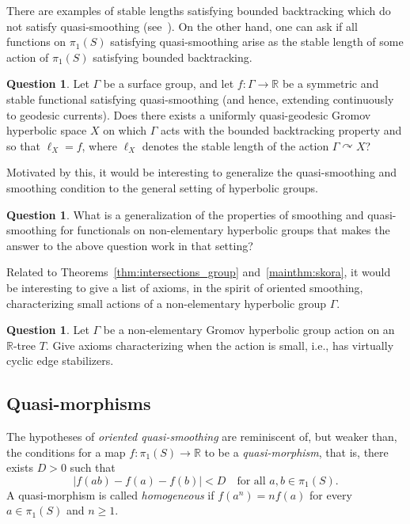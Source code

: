 \documentclass[11pt]{amsart}
\def\acts{\curvearrowright}
\numberwithin{equation}{section}
\numberwithin{figure}{section}
\theoremstyle{definition}
\newtheorem{question}[theorem]{Question}
\theoremstyle{plain}
\def\acts{\curvearrowright}
\begin{document}
There are examples of stable lengths satisfying bounded backtracking
which do not satisfy quasi-smoothing
(see~\cite[Section~9]{CMGR26:GreenMetrics}). On the other hand, one
can ask if all functions on $\pi_1(S)$ satisfying quasi-smoothing
arise as the stable length of some action of $\pi_1(S)$ satisfying
bounded backtracking. 

\begin{question}
Let $\Gamma$ be a surface group, and let $f \colon \Gamma \to \mathbb{R}$ be a symmetric and stable functional satisfying quasi-smoothing (and hence, extending continuously to geodesic currents).
Does there exists a uniformly quasi-geodesic Gromov hyperbolic space $X$ on which $\Gamma$ acts with the bounded backtracking property and so that $\ell_X = f$, where $\ell_X$ denotes the stable length of the action $\Gamma \acts X$?
\end{question}

Motivated by this, it would be interesting to generalize the quasi-smoothing and smoothing condition to the general setting of hyperbolic groups.

\begin{question}
What is a generalization of the properties of smoothing and
quasi-smoothing for functionals on non-elementary hyperbolic groups
that makes the answer to the
above question work in that setting?
\end{question}

Related to Theorems~\ref{thm:intersections_group}
and~\ref{mainthm:skora}, it would be interesting to give a list of
axioms, in the spirit of oriented smoothing, characterizing
small actions of a non-elementary hyperbolic group $\Gamma$.

\begin{question}
\label{qu:generalize_intersections}
Let $\Gamma$ be a non-elementary Gromov hyperbolic group action on an
$\mathbb{R}$-tree $T$. Give axioms  characterizing when the action is small, i.e., has
virtually cyclic edge stabilizers.
\end{question}

\subsection{Quasi-morphisms} 
\label{sub:quasimorphism} 

The hypotheses of \emph{oriented quasi-smoothing} are reminiscent of, but weaker than, the conditions for a map 
$f \colon \pi_1(S) \to \mathbb{R}$ to be a \emph{quasi-morphism}, that is, there exists $D > 0$ such that 
\[
|f(ab) - f(a) - f(b)| < D \quad \text{for all } a,b \in \pi_1(S).
\]
A quasi-morphism is called \emph{homogeneous} if $f(a^n) = n f(a)$ for every $a \in \pi_1(S)$ and $n \ge 1$.
\end{document}
